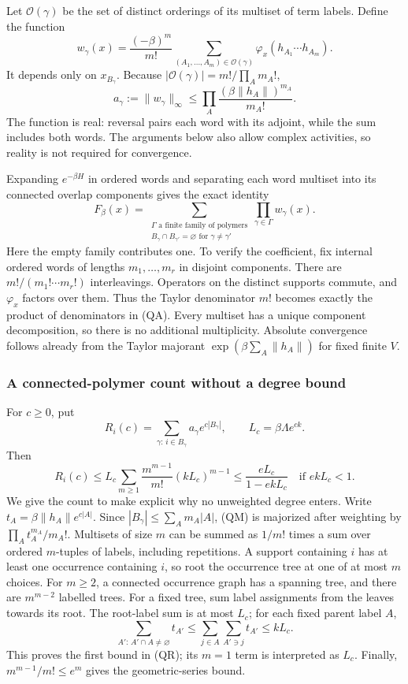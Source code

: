 Let \(\mathcal O(\gamma)\) be the set of distinct orderings of its
multiset of term labels.  Define the function
\[
 w_\gamma(x)=\frac{(-\beta)^m}{m!}
    \sum_{(A_1,\ldots,A_m)\in\mathcal O(\gamma)}
        \varphi_x(h_{A_1}\cdots h_{A_m}).
 \tag{QA}
\]
It depends only on \(x_{B_\gamma}\).  Because
\(|\mathcal O(\gamma)|=m!/\prod_A m_A!\),
\[
 a_\gamma:=\|w_\gamma\|_\infty
 \le\prod_A\frac{(\beta\|h_A\|)^{m_A}}{m_A!}.
 \tag{QM}
\]
The function is real: reversal pairs each word with its adjoint, while
the sum includes both words.  The arguments below also allow complex
activities, so reality is not required for convergence.

Expanding \(e^{-\beta H}\) in ordered words and separating each word
multiset into its connected overlap components gives the exact identity
\[
 F_\beta(x)=
 \sum_{\substack{\Gamma\text{ a finite family of polymers}\\
                  B_\gamma\cap B_{\gamma'}=\varnothing
                  \text{ for }\gamma\ne\gamma'}}
                  \prod_{\gamma\in\Gamma}w_\gamma(x).
 \tag{QP}
\]
Here the empty family contributes one.  To verify the coefficient,
fix internal ordered words of lengths \(m_1,\ldots,m_r\) in disjoint
components.  There are \(m!/(m_1!\cdots m_r!)\) interleavings.
Operators on the distinct supports commute, and \(\varphi_x\) factors
over them.  Thus the Taylor denominator \(m!\) becomes exactly the
product of denominators in (QA).  Every multiset has a unique component
decomposition, so there is no additional multiplicity.  Absolute
convergence follows already from the Taylor majorant
\(\exp(\beta\sum_A\|h_A\|)\) for fixed finite \(V\).

\subsubsection{A connected-polymer count without a degree bound}

For \(c\ge0\), put
\[
 R_i(c)=\sum_{\gamma:\,i\in B_\gamma}a_\gamma e^{c|B_\gamma|},
 \qquad L_c=\beta\Lambda e^{ck}.
\]
Then
\[
 R_i(c)\le
 L_c\sum_{m\ge1}\frac{m^{m-1}}{m!}(kL_c)^{m-1}
 \le\frac{eL_c}{1-ekL_c}
 \quad\text{if }ekL_c<1.
 \tag{QR}
\]
We give the count to make explicit why no unweighted degree enters.
Write \(t_A=\beta\|h_A\|e^{c|A|}\).  Since
\(|B_\gamma|\le\sum_A m_A|A|\), (QM) is majorized after weighting
by \(\prod_A t_A^{m_A}/m_A!\).  Multisets of size \(m\) can be
summed as \(1/m!\) times a sum over ordered \(m\)-tuples of labels,
including repetitions.  A support containing \(i\) has at least one
occurrence containing \(i\), so root the occurrence tree at one of at
most \(m\) choices.  For \(m\ge2\), a connected occurrence graph
has a spanning tree, and there are \(m^{m-2}\) labelled trees.
For a fixed tree, sum label assignments from the leaves towards its
root.  The root-label sum is at most \(L_c\); for each fixed parent
label \(A\),
\[
 \sum_{A':\,A'\cap A\ne\varnothing}t_{A'}
 \le\sum_{j\in A}\sum_{A'\ni j}t_{A'}\le kL_c.
\]
This proves the first bound in (QR); its \(m=1\) term is interpreted
as \(L_c\).  Finally,
\(m^{m-1}/m!\le e^m\) gives the geometric-series bound.

